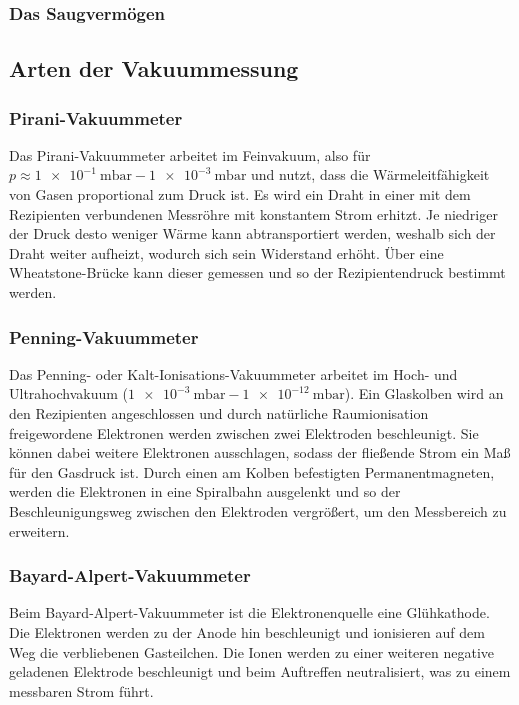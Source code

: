 \subsubsection{Das Saugvermögen}

\subsection{Arten der Vakuummessung}
\subsubsection{Pirani-Vakuummeter}
Das Pirani-Vakuummeter arbeitet im Feinvakuum, also für $p\approx \SI{1e-1}{\milli\bar} - \SI{1e-3}{\milli\bar}$ und nutzt, dass die Wärmeleitfähigkeit von Gasen proportional zum Druck ist. Es wird ein Draht in einer mit dem Rezipienten verbundenen Messröhre mit konstantem Strom erhitzt. Je niedriger der Druck desto weniger Wärme kann abtransportiert werden, weshalb sich der Draht weiter aufheizt, wodurch sich sein Widerstand erhöht. Über eine Wheatstone-Brücke kann dieser gemessen und so der Rezipientendruck bestimmt werden.\cite{Jena}
\subsubsection{Penning-Vakuummeter}
Das Penning- oder Kalt-Ionisations-Vakuummeter arbeitet im Hoch- und Ultrahochvakuum ($\SI{1e-3}{\milli\bar} - \SI{1e-12}{\milli\bar}$). Ein Glaskolben wird an den Rezipienten angeschlossen und durch natürliche Raumionisation freigewordene Elektronen werden zwischen zwei Elektroden beschleunigt. Sie können dabei weitere Elektronen ausschlagen, sodass der fließende Strom ein Maß für den Gasdruck ist. Durch einen am Kolben befestigten Permanentmagneten, werden die Elektronen in eine Spiralbahn ausgelenkt und so der Beschleunigungsweg zwischen den Elektroden vergrößert, um den Messbereich zu erweitern.\cite{Jena}
\subsubsection{Bayard-Alpert-Vakuummeter}
Beim Bayard-Alpert-Vakuummeter ist die Elektronenquelle eine Glühkathode. Die Elektronen werden zu der Anode hin beschleunigt und ionisieren auf dem Weg die verbliebenen Gasteilchen. Die Ionen werden zu einer weiteren negative geladenen Elektrode beschleunigt und beim Auftreffen neutralisiert, was zu einem messbaren Strom führt.\cite{Spektrum}
